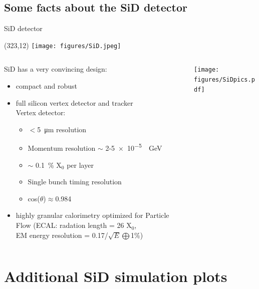 \documentclass[xcolor={dvipsnames}]{beamer}
\newcommand{\sidlogo}{
  \setlength{\TPHorizModule}{1pt}
  \setlength{\TPVertModule}{1pt}
  \begin{textblock}{1}(323,12)
   \texttt{[image: figures/SiD.jpeg]}
  \end{textblock}
  }
\begin{document}
\subsection{Some facts about the SiD detector}
\begin{frame}{SiD detector}
\sidlogo
 \begin{columns}
  \begin{column}{0.7\textwidth}
    SiD has a very convincing design:
 \begin{itemize}
  \item compact and robust
  \item full silicon vertex detector and tracker\\
  Vertex detector:
  \begin{itemize}
   \item $<$\SI{5}{\micro\metre} resolution
   \item Momentum resolution $\sim$ 2-\SI{5e-5}{\per\giga\electronvolt}
   \item $\sim$ \SI{0.1}{\percent} X$_0$ per layer
    \item Single bunch timing resolution
    \item cos($\theta$)$\approx$0.984
  \end{itemize}
  \item highly granular calorimetry optimized for Particle Flow (ECAL: radation length = 26 X$_0$, \\EM energy resolution = 0.17/$\sqrt{E}\bigoplus$1\%)
 \end{itemize}
  \end{column}
  \begin{column}{0.3\textwidth}
    \begin{flushright}
  \texttt{[image: figures/SiDpics.pdf]}
 \end{flushright}
  \end{column}
 \end{columns}

\end{frame}

\section{Additional SiD simulation plots}
\end{document}
